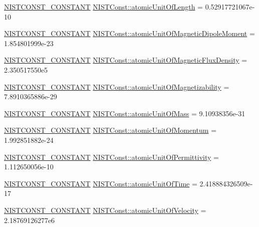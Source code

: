 \begin{DoxyCompactItemize}
\item 
\mbox{\hyperlink{group___n_i_s_t_const-_macros_ga2b0fc1d7452373f816175dd86ce26729}{N\+I\+S\+T\+C\+O\+N\+S\+T\+\_\+\+C\+O\+N\+S\+T\+A\+NT}} \mbox{\hyperlink{group___n_i_s_t_const-_atomic_unit_ga2611c2902279953d3d6a18cfd1dfce3e}{N\+I\+S\+T\+Const\+::atomic\+Unit\+Of\+Length}} = 0.\+52917721067e-\/10
\item 
\mbox{\hyperlink{group___n_i_s_t_const-_macros_ga2b0fc1d7452373f816175dd86ce26729}{N\+I\+S\+T\+C\+O\+N\+S\+T\+\_\+\+C\+O\+N\+S\+T\+A\+NT}} \mbox{\hyperlink{group___n_i_s_t_const-_atomic_unit_gacc6b0608f4456d2fb880dc295b852433}{N\+I\+S\+T\+Const\+::atomic\+Unit\+Of\+Magnetic\+Dipole\+Moment}} = 1.\+854801999e-\/23
\item 
\mbox{\hyperlink{group___n_i_s_t_const-_macros_ga2b0fc1d7452373f816175dd86ce26729}{N\+I\+S\+T\+C\+O\+N\+S\+T\+\_\+\+C\+O\+N\+S\+T\+A\+NT}} \mbox{\hyperlink{group___n_i_s_t_const-_atomic_unit_gafc19eaca8ac811b061e8630bd3203930}{N\+I\+S\+T\+Const\+::atomic\+Unit\+Of\+Magnetic\+Flux\+Density}} = 2.\+350517550e5
\item 
\mbox{\hyperlink{group___n_i_s_t_const-_macros_ga2b0fc1d7452373f816175dd86ce26729}{N\+I\+S\+T\+C\+O\+N\+S\+T\+\_\+\+C\+O\+N\+S\+T\+A\+NT}} \mbox{\hyperlink{group___n_i_s_t_const-_atomic_unit_ga20e7e2a56b476e5730ce9c59a4efc946}{N\+I\+S\+T\+Const\+::atomic\+Unit\+Of\+Magnetizability}} = 7.\+8910365886e-\/29
\item 
\mbox{\hyperlink{group___n_i_s_t_const-_macros_ga2b0fc1d7452373f816175dd86ce26729}{N\+I\+S\+T\+C\+O\+N\+S\+T\+\_\+\+C\+O\+N\+S\+T\+A\+NT}} \mbox{\hyperlink{group___n_i_s_t_const-_atomic_unit_gaffbb7b29a9d92b540321f074f46903ae}{N\+I\+S\+T\+Const\+::atomic\+Unit\+Of\+Mass}} = 9.\+10938356e-\/31
\item 
\mbox{\hyperlink{group___n_i_s_t_const-_macros_ga2b0fc1d7452373f816175dd86ce26729}{N\+I\+S\+T\+C\+O\+N\+S\+T\+\_\+\+C\+O\+N\+S\+T\+A\+NT}} \mbox{\hyperlink{group___n_i_s_t_const-_atomic_unit_ga3a2d8ad829da0868381d6f31817ed453}{N\+I\+S\+T\+Const\+::atomic\+Unit\+Of\+Momentum}} = 1.\+992851882e-\/24
\item 
\mbox{\hyperlink{group___n_i_s_t_const-_macros_ga2b0fc1d7452373f816175dd86ce26729}{N\+I\+S\+T\+C\+O\+N\+S\+T\+\_\+\+C\+O\+N\+S\+T\+A\+NT}} \mbox{\hyperlink{group___n_i_s_t_const-_atomic_unit_ga150ae2f35ef916113c6bcf612b7fa8c8}{N\+I\+S\+T\+Const\+::atomic\+Unit\+Of\+Permittivity}} = 1.\+112650056e-\/10
\item 
\mbox{\hyperlink{group___n_i_s_t_const-_macros_ga2b0fc1d7452373f816175dd86ce26729}{N\+I\+S\+T\+C\+O\+N\+S\+T\+\_\+\+C\+O\+N\+S\+T\+A\+NT}} \mbox{\hyperlink{group___n_i_s_t_const-_atomic_unit_ga1dd9cd3a8f95c754529e663dc03d7b9e}{N\+I\+S\+T\+Const\+::atomic\+Unit\+Of\+Time}} = 2.\+418884326509e-\/17
\item 
\mbox{\hyperlink{group___n_i_s_t_const-_macros_ga2b0fc1d7452373f816175dd86ce26729}{N\+I\+S\+T\+C\+O\+N\+S\+T\+\_\+\+C\+O\+N\+S\+T\+A\+NT}} \mbox{\hyperlink{group___n_i_s_t_const-_atomic_unit_gaf53a1d1a7382eb03e12e980aeb34ded4}{N\+I\+S\+T\+Const\+::atomic\+Unit\+Of\+Velocity}} = 2.\+18769126277e6
\end{DoxyCompactItemize}


